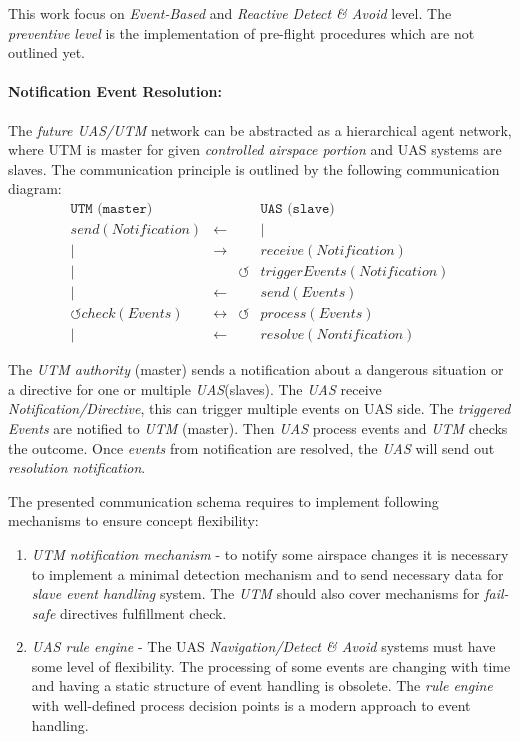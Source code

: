 This work focus on \emph{Event-Based} and \emph{Reactive Detect \& Avoid} level. The \emph{preventive level} is the implementation of pre-flight procedures which are not outlined yet.

\paragraph{Notification Event Resolution:} The \emph{future UAS/UTM} network can be abstracted as a hierarchical agent network, where UTM is master for given \emph{controlled airspace portion} and UAS systems are slaves. The communication principle is outlined by the following communication diagram:
\begin{equation*}
    \begin{aligned}
         \texttt{UTM (master)}& & &  \texttt{UAS (slave)} \\
         send(Notification)&\longleftarrow&&|\\
         |&\longrightarrow  &&receive(Notification)\\
         |& & \circlearrowleft& triggerEvents(Notification)\\
         |& \longleftarrow && send(Events)\\
         \circlearrowleft check(Events)&\longleftrightarrow  &\circlearrowleft & process(Events)\\
         |&\longleftarrow&&resolve(Nontification)
    \end{aligned}
\end{equation*}

\noindent The \emph{UTM authority} (master) sends a notification about a dangerous situation or a directive for one or multiple \emph{UAS}(slaves). The \emph{UAS} receive \emph{Notification/Directive}, this can trigger multiple events on UAS side. The \emph{triggered Events} are notified to \emph{UTM} (master). Then \emph{UAS} process events and \emph{UTM} checks the outcome. Once \emph{events} from notification are resolved, the \emph{UAS} will send out \emph{resolution notification}. 

The presented communication schema requires to implement following mechanisms to ensure concept flexibility:
\begin{enumerate}
    \item \emph{UTM notification mechanism} - to notify some airspace changes it is necessary to implement a minimal detection mechanism and to send necessary data for \emph{slave event handling} system. The \emph{UTM} should also cover mechanisms for \emph{fail-safe} directives fulfillment check.
    
    \item \emph{UAS rule engine} - The UAS \emph{Navigation/Detect \& Avoid} systems must have some level of flexibility. The processing of some events are changing with time and having a static structure of event handling is obsolete. The \emph{rule engine} with well-defined process decision points is a modern approach to event handling.
\end{enumerate}

